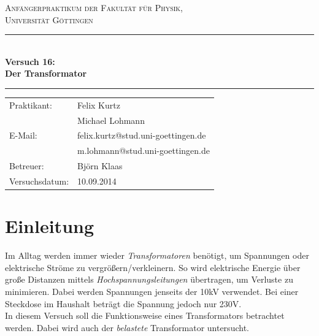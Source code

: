 \documentclass[12pt,a4paper,titlepage,headinclude,bibtotoc]{scrartcl}
\begin{document}
\begin{titlepage}
\centering
\textsc{\Large Anfängerpraktikum der Fakultät für
  Physik,\\[1.5ex] Universität Göttingen}

\vspace*{4.2cm}

\rule{\textwidth}{1pt}\\[0.5cm]
{\huge \bfseries
 Versuch 16:\\[1.5ex]
 Der Transformator}\\[0.5cm]
\rule{\textwidth}{1pt}

\vspace*{3.0cm}

\begin{Large}
\begin{tabular}{ll}
Praktikant:
 	&  Felix Kurtz\\
 	&  Michael Lohmann\\

  E-Mail: 
	&  felix.kurtz@stud.uni-goettingen.de\\
	& m.lohmann@stud.uni-goettingen.de\\

 Betreuer: & Björn Klaas\\
 Versuchsdatum: & 10.09.2014\\
\end{tabular}
\end{Large}

\vspace*{0.8cm}

\begin{Large}
\end{Large}

\end{titlepage}

\tableofcontents

\newpage

\section{Einleitung}
\label{sec:einleitung}
Im Alltag werden immer wieder \textit{Transformatoren} benötigt, um Spannungen oder elektrische Ströme zu vergrößern/verkleinern.
So wird elektrische Energie über große Distanzen mittels \textit{Hochspannungsleitungen} übertragen, um Verluste zu minimieren.
Dabei werden Spannungen jenseits der 10kV verwendet.
Bei einer Steckdose im Haushalt beträgt die Spannung jedoch nur 230V.\\
In diesem Versuch soll die Funktionsweise eines Transformators betrachtet werden.
Dabei wird auch der \textit{belastete} Transformator untersucht.
\end{document}
